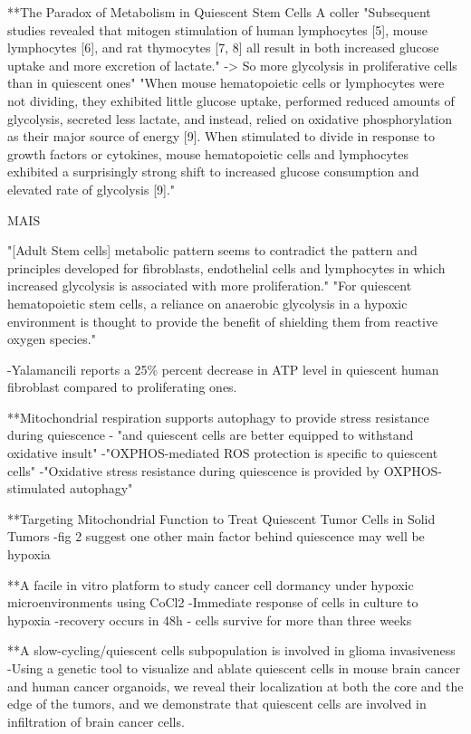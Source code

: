 \documentclass[11pt,a4paper]{article}
\begin{document}
**The Paradox of Metabolism in Quiescent Stem Cells A coller
"Subsequent studies revealed that mitogen stimulation of human lymphocytes [5], mouse lymphocytes [6], and rat thymocytes [7, 8] all result in both increased glucose uptake and more excretion of lactate." -> So more glycolysis in proliferative cells than in quiescent ones"
"When mouse hematopoietic cells or lymphocytes were not dividing, they exhibited little glucose uptake, performed reduced amounts of glycolysis, secreted less lactate, and instead, relied on oxidative phosphorylation as their major source of energy [9]. When stimulated to divide in response to growth factors or cytokines, mouse hematopoietic cells and lymphocytes exhibited a surprisingly strong shift to increased glucose consumption and elevated rate of glycolysis [9]."

MAIS 

"[Adult Stem cells] metabolic pattern seems to contradict the pattern and principles developed for fibroblasts, endothelial cells and lymphocytes in which increased glycolysis is associated with more proliferation."
"For quiescent hematopoietic stem cells, a reliance on anaerobic glycolysis in a hypoxic environment is thought to provide the benefit of shielding them from reactive oxygen species."



-Yalamancili reports a 25\% percent decrease in ATP level in quiescent human fibroblast compared to proliferating ones.

**Mitochondrial respiration supports autophagy to provide stress resistance during quiescence 
- "and quiescent cells are better equipped to withstand oxidative insult"
-"OXPHOS-mediated ROS protection is specific to quiescent cells"
-"Oxidative stress resistance during quiescence is provided by OXPHOS-stimulated autophagy"

**Targeting Mitochondrial Function to Treat Quiescent Tumor Cells in Solid Tumors
-fig 2 suggest one other main factor behind quiescence may well be hypoxia

**A facile in vitro platform to study cancer cell dormancy under hypoxic microenvironments using CoCl2
-Immediate response of cells in culture to hypoxia
-recovery occurs in 48h 
- cells survive for more than three weeks

**A slow-cycling/quiescent cells subpopulation is involved in glioma invasiveness
-Using a genetic tool to visualize and ablate quiescent cells in mouse brain cancer and human cancer
organoids, we reveal their localization at both the core and the edge of the tumors, and we demonstrate that quiescent cells are involved in infiltration of brain cancer cells.
\end{document}
